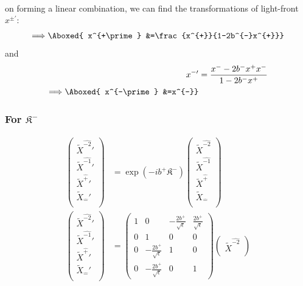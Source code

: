 \documentclass[]{article}
\numberwithin{equation}{section}
\begin{document}
{{\begin{align}
\end{align}
on forming a linear combination, we can find the transformations of light-front $x^{\pm\prime}$:
\begin{align}
    \Longrightarrow\Aboxed{ x^{+\prime} &=\frac{x^{+}}{1-2b^{-}x^{+}}}
\end{align}
and
\begin{align}
    x^{-\prime} &=\frac{x^{-}-2b^{-}x^{+}x^{-}}{1-2b^{-}x^{+}}\\
     \Longrightarrow\Aboxed{ x^{-\prime} &=x^{-}}
\end{align}
\subsubsection{For $\mathfrak{K}^{-}$}
\begin{align}
\begin{pmatrix}
    \tilde{X}^{\hat{-2}}'\\
    \tilde{X}^{\hat{-1}}'\\
    \tilde{X}^{\hat{+}}'\\
    \tilde{X}_{\hat{-}}'\\
    \end{pmatrix}&= \exp{\left(-ib^{+}\mathfrak{K}^{-}\right)}\begin{pmatrix}
    \tilde{X}^{\hat{-2}}\\
    \tilde{X}^{\hat{-1}}\\
    \tilde{X}^{\hat{+}}\\
    \tilde{X}_{\hat{-}}\\
    \end{pmatrix}\\
    \begin{pmatrix}
    \tilde{X}^{\hat{-2}}'\\
    \tilde{X}^{\hat{-1}}'\\
    \tilde{X}^{\hat{+}}'\\
    \tilde{X}_{\hat{-}}'\\
    \end{pmatrix}&= \begin{pmatrix}
        1&0&-\frac{2b^{+}}{\sqrt{\epsilon}}&\frac{2b^{+}}{\sqrt{\epsilon}}\\
        0&1&0&0\\
        0&-\frac{2b^{+}}{\sqrt{\epsilon}}&1&0\\
        0&-\frac{2b^{+}}{\sqrt{\epsilon}}&0&1
    \end{pmatrix}\begin{pmatrix}
    \tilde{X}^{\hat{-2}}\\

\end{pmatrix}
\end{align}}}
\end{document}

